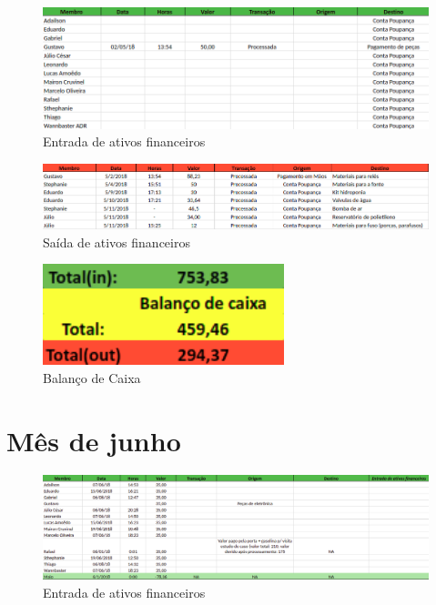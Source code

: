 \begin{figure}[H]
	\centering
	\includegraphics[width=17cm]{figuras/entrada_ativos_maio.png}
	\caption{Entrada de ativos financeiros} \label{entrada_ativos_maio}
\end{figure}

\begin{figure}[H]
	\centering
	\includegraphics[width=17cm]{figuras/saida_ativos_maio.png}
	\caption{Saída de ativos financeiros} \label{saida_ativos_maio}
\end{figure}

\begin{figure}[H]
	\centering
	\includegraphics[width=7cm]{figuras/balanco_maio.png}
	\caption{Balanço de Caixa} \label{balanco_maio}
\end{figure}

\section{Mês de junho}

\begin{figure}[H]
	\centering
	\includegraphics[width=17cm]{figuras/entrada_ativos_junho.png}
	\caption{Entrada de ativos financeiros} \label{entrada_ativos_junho}
\end{figure}

